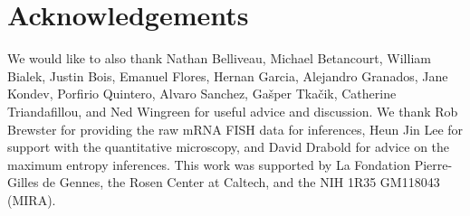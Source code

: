 \section*{Acknowledgements}

We would like to also thank Nathan Belliveau, Michael Betancourt, William
Bialek, Justin Bois, Emanuel Flores, Hernan Garcia, Alejandro Granados, Jane
Kondev, Porfirio Quintero, Alvaro Sanchez, Gašper Tkačik, Catherine
Triandafillou, and Ned Wingreen for useful advice and discussion. We thank Rob
Brewster for providing the raw mRNA FISH data for inferences, Heun Jin Lee for
support with the quantitative microscopy, and David Drabold for advice on the
maximum entropy inferences. This work was supported by La Fondation
Pierre-Gilles de Gennes, the Rosen Center at Caltech, and the NIH 1R35 GM118043
(MIRA).

